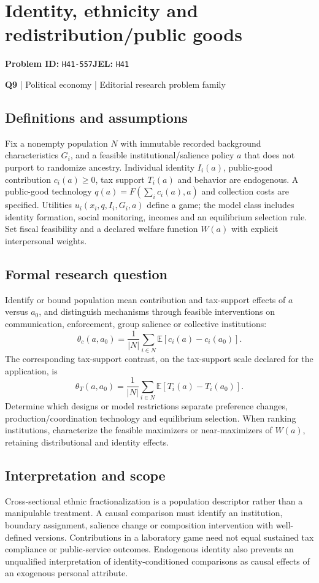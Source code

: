 \documentclass[11pt,a4paper]{article}
\begin{document}
\section*{Identity, ethnicity and redistribution/public goods}
\textbf{Problem ID:} \texttt{H41-557}\quad \textbf{JEL:} \texttt{H41}\par
\label{problem:OP-0129}
\label{atlas:prob:Q9}
{\sffamily\small\color{muted}\textbf{Q9} | Political economy | Editorial research problem family\par}
\subsection*{Definitions and assumptions}
Fix a nonempty population $N$ with immutable recorded background characteristics $G_i$, and a feasible institutional/salience policy $a$ that does not purport to randomize ancestry. Individual identity $I_i(a)$, public-good contribution $c_i(a)\geq0$, tax support $T_i(a)$ and behavior are endogenous. A public-good technology $q(a)=F(\sum_i c_i(a),a)$ and collection costs are specified. Utilities $u_i(x_i,q,I_i,G_i,a)$ define a game; the model class includes identity formation, social monitoring, incomes and an equilibrium selection rule. Set fiscal feasibility and a declared welfare function $W(a)$ with explicit interpersonal weights.
\subsection*{Formal research question}
Identify or bound population mean contribution and tax-support effects of $a$ versus $a_0$, and distinguish mechanisms through feasible interventions on communication, enforcement, group salience or collective institutions:
\[
\theta_c(a,a_0)=\frac1{|N|}\sum_{i\in N}\mathbb E[c_i(a)-c_i(a_0)].
\]
The corresponding tax-support contrast, on the tax-support scale declared for the application, is
\[
\theta_T(a,a_0)=\frac1{|N|}\sum_{i\in N}\mathbb E[T_i(a)-T_i(a_0)].
\]
Determine which designs or model restrictions separate preference changes, production/coordination technology and equilibrium selection. When ranking institutions, characterize the feasible maximizers or near-maximizers of $W(a)$, retaining distributional and identity effects.
\subsection*{Interpretation and scope}
Cross-sectional ethnic fractionalization is a population descriptor rather than a manipulable treatment. A causal comparison must identify an institution, boundary assignment, salience change or composition intervention with well-defined versions. Contributions in a laboratory game need not equal sustained tax compliance or public-service outcomes. Endogenous identity also prevents an unqualified interpretation of identity-conditioned comparisons as causal effects of an exogenous personal attribute.
\end{document}
